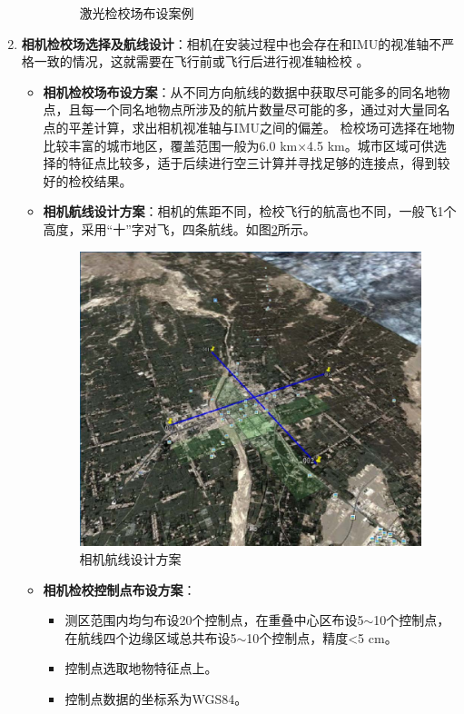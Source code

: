\begin{enumerate}
\begin{itemize}
\begin{figure}[htbp]
					\caption{激光检校场布设案例}
					\label{fig:激光检校场布设案例}
				\end{figure}
		\end{itemize}
	\item \textbf{相机检校场选择及航线设计}：相机在安装过程中也会存在和IMU的视准轴不严格一致的情况，这就需要在飞行前或飞行后进行视准轴检校 。
		\begin{itemize}
			\item \textbf{相机检校场布设方案}：从不同方向航线的数据中获取尽可能多的同名地物点，且每一个同名地物点所涉及的航片数量尽可能的多，通过对大量同名点的平差计算，求出相机视准轴与IMU之间的偏差。
				检校场可选择在地物比较丰富的城市地区，覆盖范围一般为6.0 km×4.5 km。城市区域可供选择的特征点比较多，适于后续进行空三计算并寻找足够的连接点，得到较好的检校结果。
			\item \textbf{相机航线设计方案}：相机的焦距不同，检校飞行的航高也不同，一般飞1个高度，采用“十”字对飞，四条航线。如图\ref{fig:相机航线设计方案}所示。
				\begin{figure}[htbp]
					\centering
					\includegraphics[width=0.7\linewidth]{figure/Chapter5/相机航线设计方案}
					\caption{相机航线设计方案}
					\label{fig:相机航线设计方案}
				\end{figure}
			\item \textbf{相机检校控制点布设方案}：
				\begin{itemize}
					\item 测区范围内均匀布设20个控制点，在重叠中心区布设5$ \sim $10个控制点，在航线四个边缘区域总共布设5$ \sim $10个控制点，精度<5 cm。
					\item 控制点选取地物特征点上。
					\item 控制点数据的坐标系为WGS84。
				\end{itemize}
		\end{itemize}
\end{enumerate}


